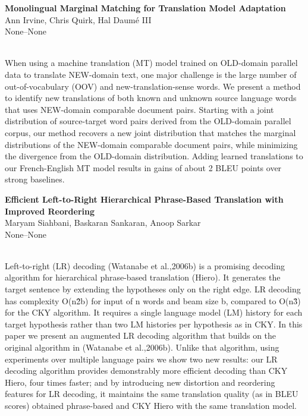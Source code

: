 \documentclass[twoside,makeidx]{book}
\renewcommand{\normalsize}{\fontsize{8}{9}\selectfont}
\renewcommand{\small}{\fontsize{7}{8}\selectfont}
\begin{document}
\par\vspace{2em}\noindent%
\begin{minipage}{\linewidth}%
\begin{center}
\textbf{\normalsize Monolingual Marginal Matching for Translation Model Adaptation}\\
\normalsize  Ann Irvine,  Chris Quirk,  Hal Daum\'{e} III\\
{\small None--None}\\
\end{center}
\end{minipage}\\[0.5em]
\nopagebreak%
\noindent%
{\small When using a machine translation (MT) model trained on OLD-domain parallel data to translate NEW-domain text, one major challenge is the large number of out-of-vocabulary (OOV) and new-translation-sense words. We present a method to identify new translations of both known and unknown source language words that uses NEW-domain comparable document pairs. Starting with a joint distribution of source-target word pairs derived from the OLD-domain parallel corpus, our method recovers a new joint distribution that matches the marginal distributions of the NEW-domain comparable document pairs, while minimizing the divergence from the OLD-domain distribution. Adding learned translations to our French-English MT model results in gains of about 2 BLEU points over strong baselines.}
\par\vspace{2em}\noindent%
\begin{minipage}{\linewidth}%
\begin{center}
\textbf{\normalsize Efficient Left-to-Right Hierarchical Phrase-Based Translation with Improved Reordering}\\
\normalsize  Maryam Siahbani,  Baskaran Sankaran,  Anoop Sarkar\\
{\small None--None}\\
\end{center}
\end{minipage}\\[0.5em]
\nopagebreak%
\noindent%
{\small Left-to-right (LR) decoding (Watanabe et al.,2006b) is a promising decoding algorithm for hierarchical phrase-based translation (Hiero). It generates the target sentence by extending the hypotheses only on the right edge. LR decoding has complexity O(n\^2b) for input of n words and beam size b, compared to O(n\^3) for the CKY algorithm. It requires a single language model (LM) history for each target hypothesis rather than two LM histories per hypothesis as in CKY. In this paper we present an augmented LR decoding algorithm that builds on the original algorithm in (Watanabe et al.,2006b). Unlike that algorithm, using experiments over multiple language pairs we show two new results: our LR decoding algorithm provides demonstrably more efficient decoding than CKY Hiero, four times faster; and by introducing new distortion and reordering features for LR decoding, it maintains the same translation quality (as in BLEU scores) obtained phrase-based and CKY Hiero with the same translation model.}
\end{document}
